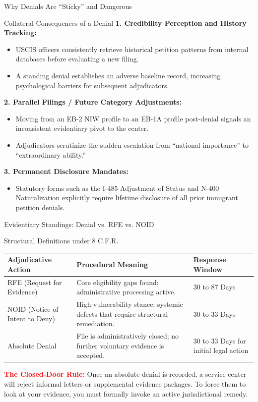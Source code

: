 \documentclass[11pt]{beamer}
\begin{document}
	\begin{frame}{Why Denials Are ``Sticky'' and Dangerous}
		\scriptsize
		\begin{block}{Collateral Consequences of a Denial}
			\textbf{1. Credibility Perception and History Tracking:}
			\begin{itemize}
				\item USCIS officers consistently retrieve historical petition patterns from internal databases before evaluating a new filing.
				\item A standing denial establishes an adverse baseline record, increasing psychological barriers for subsequent adjudicators.
			\end{itemize}
			\textbf{2. Parallel Filings / Future Category Adjustments:}
			\begin{itemize}
				\item Moving from an EB-2 NIW profile to an EB-1A profile post-denial signals an inconsistent evidentiary pivot to the center.
				\item Adjudicators scrutinize the sudden escalation from ``national importance'' to ``extraordinary ability.''
			\end{itemize}
			\textbf{3. Permanent Disclosure Mandates:}
			\begin{itemize}
				\item Statutory forms such as the I-485 Adjustment of Status and N-400 Naturalization explicitly require lifetime disclosure of all prior immigrant petition denials.
			\end{itemize}
		\end{block}
	\end{frame}
	
	\begin{frame}{Evidentiary Standings: Denial vs. RFE vs. NOID}
		\scriptsize
		\begin{block}{Structural Definitions under 8 C.F.R.}
			\centering
			\begin{tabular}{|p{3cm}|p{5cm}|p{2.5cm}|}
				\hline
				\textbf{Adjudicative Action} & \textbf{Procedural Meaning} & \textbf{Response Window} \\
				\hline
				RFE (Request for Evidence) & Core eligibility gaps found; administrative processing active. & 30 to 87 Days \\
				\hline
				NOID (Notice of Intent to Deny) & High-vulnerability stance; systemic defects that require structural remediation. & 30 to 33 Days \\
				\hline
				Absolute Denial & File is administratively closed; no further voluntary evidence is accepted. & 30 to 33 Days for initial legal action \\
				\hline
			\end{tabular}
			\vspace{0.2cm}
			\flushleft \textcolor{red}{\textbf{The Closed-Door Rule:}} Once an absolute denial is recorded, a service center will reject informal letters or supplemental evidence packages. To force them to look at your evidence, you must formally invoke an active jurisdictional remedy.
		\end{block}
	\end{frame}
	
\end{document}
